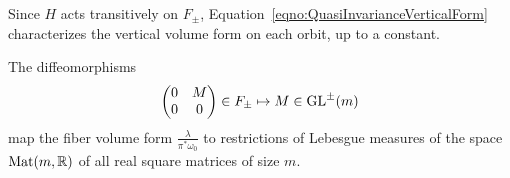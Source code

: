 \documentclass[english]{article}
\begin{document}
Since $H$ acts transitively on $F_\pm$, Equation~\eqref{eqno:QuasiInvarianceVerticalForm} characterizes the vertical volume form on each orbit, up to a constant.

\begin{proposition}\label{propno:LebesgueMeasure}
	The diffeomorphisms
	\begin{equation}\label{eqno:Nilpotent->Grass}
		\begin{pmatrix}
			0 & M\\
			0 & 0
		\end{pmatrix}
		\in F_{\pm}
		\mapsto 
		M \in \operatorname{GL}^\pm (m)
	\end{equation}
	map the fiber volume form
	$\frac{\lambda}{\pi^*\omega_0}$
	to restrictions of Lebesgue measures of the space $\operatorname{Mat}(m, \mathbb{R})$ of all real square matrices of size $m$.
\end{proposition}
\end{document}
